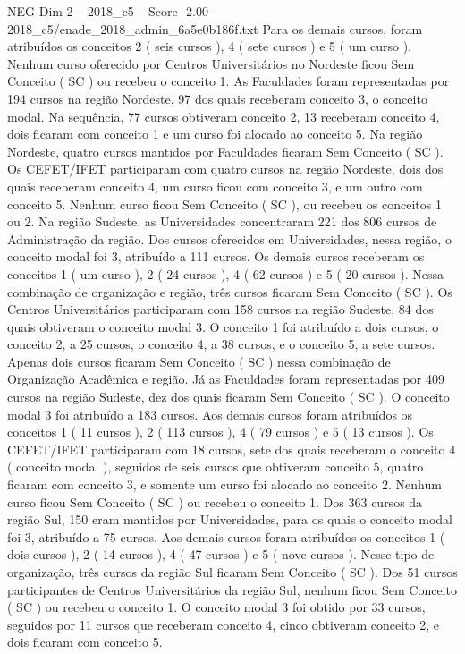 \begin{textsample}{NEG Dim 2 – 2018\_c5 – Score -2.00 – 2018\_c5/enade\_2018\_admin\_6a5e0b186f.txt}
Para os demais cursos, foram atribuídos os conceitos 2 ( seis cursos ), 4 ( sete cursos ) e 5 ( um curso ).
Nenhum curso oferecido por Centros Universitários no Nordeste ficou Sem Conceito ( SC ) ou recebeu o conceito 1.
As Faculdades foram representadas por 194 cursos na região Nordeste, 97 dos quais receberam conceito 3, o conceito modal.
Na sequência, 77 cursos obtiveram conceito 2, 13 receberam conceito 4, dois ficaram com conceito 1 e um curso foi alocado ao conceito 5.
Na região Nordeste, quatro cursos mantidos por Faculdades ficaram Sem Conceito ( SC ).
Os CEFET/IFET participaram com quatro cursos na região Nordeste, dois dos quais receberam conceito 4, um curso ficou com conceito 3, e um outro com conceito 5.
Nenhum curso ficou Sem Conceito ( SC ), ou recebeu os conceitos 1 ou 2.
Na região Sudeste, as Universidades concentraram 221 dos 806 cursos de Administração da região.
Dos cursos oferecidos em Universidades, nessa região, o conceito modal foi 3, atribuído a 111 cursos.
Os demais cursos receberam os conceitos 1 ( um curso ), 2 ( 24 cursos ), 4 ( 62 cursos ) e 5 ( 20 cursos ).
Nessa combinação de organização e região, três cursos ficaram Sem Conceito ( SC ).
Os Centros Universitários participaram com 158 cursos na região Sudeste, 84 dos quais obtiveram o conceito modal 3.
O conceito 1 foi atribuído a dois cursos, o conceito 2, a 25 cursos, o conceito 4, a 38 cursos, e o conceito 5, a sete cursos.
Apenas dois cursos ficaram Sem Conceito ( SC ) nessa combinação de Organização Acadêmica e região.
Já as Faculdades foram representadas por 409 cursos na região Sudeste, dez dos quais ficaram Sem Conceito ( SC ).
O conceito modal 3 foi atribuído a 183 cursos.
Aos demais cursos foram atribuídos os conceitos 1 ( 11 cursos ), 2 ( 113 cursos ), 4 ( 79 cursos ) e 5 ( 13 cursos ).
Os CEFET/IFET participaram com 18 cursos, sete dos quais receberam o conceito 4 ( conceito modal ), seguidos de seis cursos que obtiveram conceito 5, quatro ficaram com conceito 3, e somente um curso foi alocado ao conceito 2.
Nenhum curso ficou Sem Conceito ( SC ) ou recebeu o conceito 1.
Dos 363 cursos da região Sul, 150 eram mantidos por Universidades, para os quais o conceito modal foi 3, atribuído a 75 cursos.
Aos demais cursos foram atribuídos os conceitos 1 ( dois cursos ), 2 ( 14 cursos ), 4 ( 47 cursos ) e 5 ( nove cursos ).
Nesse tipo de organização, três cursos da região Sul ficaram Sem Conceito ( SC ).
Dos 51 cursos participantes de Centros Universitários da região Sul, nenhum ficou Sem Conceito ( SC ) ou recebeu o conceito 1.
O conceito modal 3 foi obtido por 33 cursos, seguidos por 11 cursos que receberam conceito 4, cinco obtiveram conceito 2, e dois ficaram com conceito 5.

\end{textsample}
